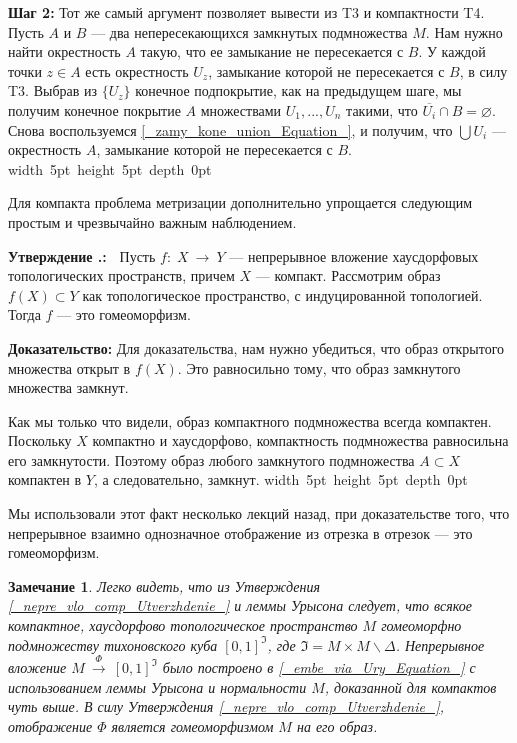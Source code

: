 \documentclass[12pt]{book}
\newcommand{\arrow}{{\:\longrightarrow\:}}
\def\endproof{\hbox{\vrule width 5pt height 5pt depth 0pt}}
\renewcommand{\emptyset}{\varnothing}
\theoremstyle{upshape}
\newtheorem{zadacha}{Задача}[chapter]
\theoremstyle{generic}
\newtheorem{remark}[teorema]{Замечание}
\def\замечание{\begin{remark}}
\def\еза{\end{remark}}
\theoremstyle{upshapenonumber}
\newtheorem{ukazanie}{Указание}[section]
\newcommand{\следствие}{%
     \refstepcounter{teorema}
     {\noindent\bf Следствие \thechapter.\arabic{teorema}:\ }}
\newcommand{\пример}{%
     \refstepcounter{teorema}
     {\noindent\bf Пример \thechapter.\arabic{teorema}:\ }}
\newcommand{\лемма}{%
     \refstepcounter{teorema}
     {\noindent\bf Лемма \thechapter.\arabic{teorema}:\ }}
\newcommand{\теорема}{%
     \refstepcounter{teorema}
     {\noindent\bf Теорема \thechapter.\arabic{teorema}:\ }}
\newcommand{\утверждение}{%
     \refstepcounter{teorema}
     {\noindent\bf Утверждение \thechapter.\arabic{teorema}:\ }}
\def\хфилл{\hfill}
\def\ноиндент{\noindent}
\def\бф{\bf}
\def\ем{\em}
\def\задача{\begin{zadacha}}
\def\ез{\end{zadacha}}
\def\указание{\begin{ukazanie}}
\def\еу{\end{ukazanie}}
\def\ео{\end{opredelenie}}
\def\goth{\mathfrak}
\def\енум{\begin{enumerate}}
\def\ее{\end{enumerate}}
\begin{document}
\хфилл

\ноиндент
{\бф Шаг 2:} Тот же самый аргумент позволяет
вывести из T3 и компактности T4. Пусть $A$ и $B$ --- 
два непересекающихся замкнутых подмножества $M$.
Нам нужно найти окрестность $A$ такую, что
ее замыкание не пересекается с $B$. У каждой
точки $z\in A$ есть окрестность $U_z$, замыкание которой
не пересекается с $B$, в силу T3. Выбрав из $\{U_z\}$
конечное подпокрытие, как на предыдущем шаге,
мы получим конечное покрытие $A$ множествами $U_1, ..., U_n$
такими, что $\overline {U_i}\cap B=\emptyset$.
Снова воспользуемся \eqref{_zamy_kone_union_Equation_},
и получим, что $\bigcup U_i$ --- окрестность
$A$, замыкание которой не пересекается с $B$.
\endproof

\хфилл

Для компакта проблема метризации
дополнительно упрощается следующим простым 
и чрезвычайно важным наблюдением.

\хфилл

\утверждение \label{_nepre_vlo_comp_Utverzhdenie_}
Пусть $f:\; X \arrow Y$ --- непрерывное вложение
хаусдорфовых топологических пространств, причем $X$ --- компакт.
Рассмотрим образ $f(X) \subset Y$ как топологическое
пространство, с индуцированной топологией.
Тогда $f$ --- это гомеоморфизм.

\хфилл

\ноиндент
{\бф Доказательство:}
Для доказательства, нам нужно убедиться,
что образ открытого множества открыт в $f(X)$.
Это равносильно тому, что
образ замкнутого множества замкнут.

Как мы только что видели, образ компактного подмножества
всегда компактен. Поскольку $X$ компактно и хаусдорфово,
компактность подмножества равносильна его замкнутости.
Поэтому образ любого замкнутого подмножества $A\subset X$
компактен в $Y$, а следовательно, замкнут.
\endproof

\хфилл

Мы использовали этот факт несколько лекций назад,
при доказательстве того, что непрерывное
взаимно однозначное отображение из отрезка
в отрезок --- это гомеоморфизм.

\замечание
Легко видеть, что из Утверждения \ref{_nepre_vlo_comp_Utverzhdenie_}
и леммы Урысона следует, что всякое компактное, хаусдорфово топологическое
пространство $M$ гомеоморфно подмножеству тихоновского куба $[0,1]^{\goth I}$,
где ${\goth I}= M \times M \backslash \Delta$.
Непрерывное вложение $M \stackrel\Phi\arrow  [0,1]^{\goth I}$ было построено в
\eqref{_embe_via_Ury_Equation_} с использованием леммы Урысона
и нормальности $M$, доказанной для компактов чуть выше.
В силу Утверждения \ref{_nepre_vlo_comp_Utverzhdenie_},
отображение $\Phi$ является гомеоморфизмом $M$ на его образ.
\еза
\end{document}
